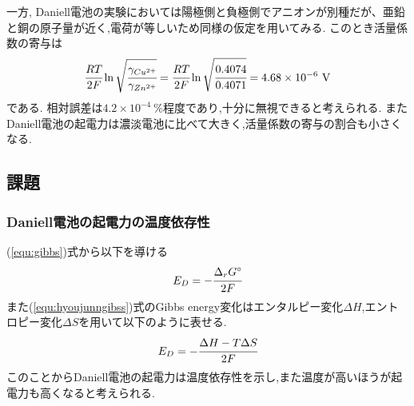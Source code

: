 
一方, Daniell電池の実験においては陽極側と負極側でアニオンが別種だが、亜鉛と銅の原子量が近く,電荷が等しいため同様の仮定を用いてみる.
このとき活量係数の寄与は
\begin{equation*}
  \cfrac{RT}{2F} \ln \sqrt{\cfrac{\gamma_{Cu^{2+}}}{\gamma_{Zn^{2+}}}}=\cfrac{RT}{2F} \ln \sqrt{\cfrac{0.4074}{0.4071}}=4.68\times10^{-6}\ \si{\volt}
\end{equation*}
である.
相対誤差は$4.2\times10^{-4}\ \%$程度であり,十分に無視できると考えられる.
またDaniell電池の起電力は濃淡電池に比べて大きく,活量係数の寄与の割合も小さくなる.
\subsection{課題}
\subsubsection{Daniell電池の起電力の温度依存性}
(\ref{equ:gibbs})式から以下を導ける
\begin{equation}
  \label{equ:hyoujunngibss}
  E_D=-\cfrac{\Delta_rG^{\circ}}{2F}
\end{equation}
また(\ref{equ:hyoujunngibss})式のGibbs energy変化はエンタルピー変化$\Delta H$,エントロピー変化$\Delta S$を用いて以下のように表せる\cite{jiten}.
\begin{equation}
  \label{equ:enen}
  E_D=-\cfrac{\Delta H - T\Delta S}{2F}
\end{equation}
このことからDaniell電池の起電力は温度依存性を示し,また温度が高いほうが起電力も高くなると考えられる.
